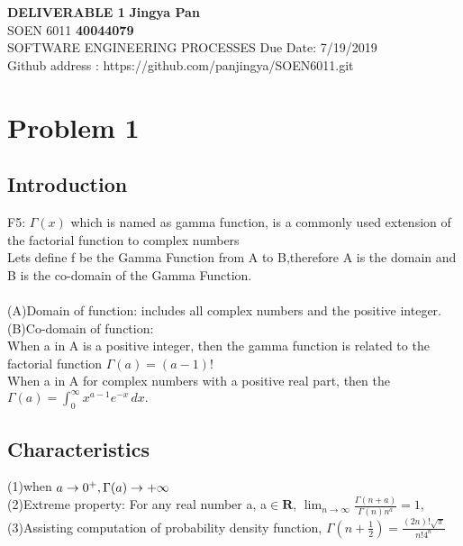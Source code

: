 \documentclass[a4paper, 11pt]{article}
\begin{document}
\noindent
\large\textbf{DELIVERABLE 1} \hfill \textbf{Jingya Pan} \\
\normalsize SOEN 6011 \hfill \textbf{40044079} \\
 SOFTWARE ENGINEERING PROCESSES \hfill Due Date: 7/19/2019 \\
 \hfill Github address : https://github.com/panjingya/SOEN6011.git

\section{Problem 1}
\subsection{Introduction}

F5: $\Gamma \left( x \right)$ which is named as gamma function, is a commonly used extension of the factorial function to complex numbers\\

Lets define f be the Gamma Function from A to B,therefore A is the domain and B is the  co-domain of the Gamma Function.\\ \\
\indent(A)Domain of function: includes all complex numbers and the positive integer.\\

(B)Co-domain of function: \\
\indent\indent\indent When a in A is a positive integer, then the gamma function is related to the factorial function  $\Gamma(a) = (a-1)!$ \\
\indent\indent\indent When a in A for complex numbers with a positive real part, then the ${\displaystyle \Gamma (a)=\int _{0}^{\infty }x^{a-1}e^{-x}\,dx.}$

\subsection{Characteristics}
\indent\indent (1)when ${\displaystyle} a\to 0^+, {\displaystyle} \Gamma(a)\to+\infty$ \\

\indent (2)Extreme property: For any real number a,  a$\in\mathbf{R}$, $\lim_{n\to\infty} \frac{\Gamma(n+a)}{\Gamma(n)n^{a}} = 1, $ \\

\indent (3)Assisting computation of probability density function, ${\displaystyle \Gamma \left(n+{\tfrac {1}{2}}\right)={\frac {(2n)!{\sqrt {\pi }}}{n!4^{n}}}}$ \\
\end{document}
